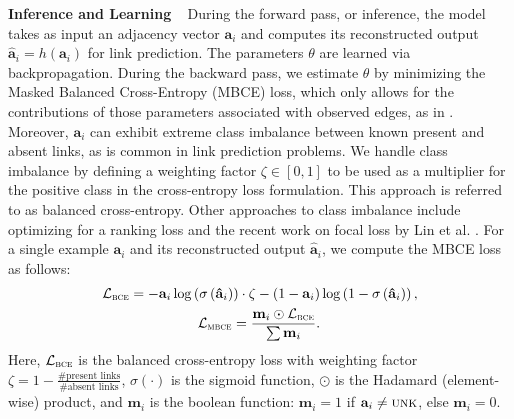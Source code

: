 \documentclass[letterpaper, conference]{IEEEtran}  %
\begin{document}
\noindent \textbf{Inference and Learning} ~ During the forward pass, or inference, the model takes as input an adjacency vector $\mathbf{a}_i$ and computes its reconstructed output $\mathbf{\hat{a}}_i = h(\mathbf{a}_i)$ for link prediction. The parameters $\theta$ are learned via backpropagation. During the backward pass, we estimate $\theta$ by minimizing the Masked Balanced Cross-Entropy (MBCE) loss, which only allows for the contributions of those parameters associated with observed edges, as in \cite{Sedhain:2015}. Moreover, $\mathbf{a}_i$ can exhibit extreme class imbalance between known present and absent links, as is common in link prediction problems. We handle class imbalance by defining a weighting factor $\zeta \in [0,1]$ to be used as a multiplier for the positive class in the cross-entropy loss formulation. This approach is referred to as balanced cross-entropy. Other approaches to class imbalance include optimizing for a ranking loss \cite{Menon:2011} and the recent work on focal loss by Lin et al. \cite{Lin:2017}. For a single example $\mathbf{a}_i$ and its reconstructed output $\mathbf{\hat{a}}_i$, we compute the MBCE loss as follows:
\begin{align*}
\mathcal{L}_{\textsc{bce}} = -\mathbf{a}_i \log\left(\sigma\left(\mathbf{\hat{a}}_i\right)\right) \cdot \zeta - (1 - \mathbf{a}_i) &\log\left(1 - \sigma\left(\mathbf{\hat{a}}_i\right)\right), \\
\mathcal{L}_{\textsc{mbce}} = \frac{\mathbf{m}_i \odot \mathcal{L}_{\textsc{bce}}} {\sum \mathbf{m}_i}.
\end{align*}
Here, $\mathcal{L}_{\textsc{bce}}$ is the balanced cross-entropy loss with weighting factor $\zeta = 1 - \frac{\text{\# present links}}{\text{\# absent links}}$, $\sigma(\cdot)$ is the sigmoid function, $\odot$ is the Hadamard (element-wise) product,  and $\mathbf{m}_i$ is the boolean function: $\mathbf{m}_i = 1$  if $\mathbf{a}_i \neq \textsc{unk}$, else $\mathbf{m}_i = 0$.
\end{document}
